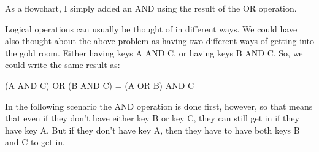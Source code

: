 As a flowchart, I simply added an AND using the result of the OR operation.

\begin{center} \end{center}



Logical operations can usually be thought of in different ways. We could have also thought about the above problem as having two different ways of getting into the gold room. Either having keys A AND C, or having keys B AND C. So, we could write the same result as:\\

\begin{center}
	(A AND C) OR (B AND C) = (A OR B) AND C
\end{center}

\begin{center} \end{center}

In the following scenario the AND operation is done first, however, so that means that even if they don't have either key B or key C, they can still get in if they have key A. But if they don't have key A, then they have to have both keys B and C to get in.\\

\begin{center} \end{center}

